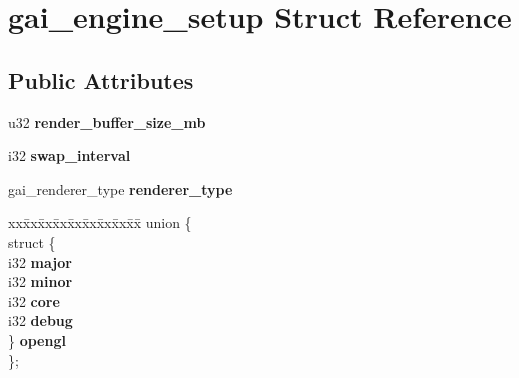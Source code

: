 \hypertarget{structgai__engine__setup}{}\section{gai\+\_\+engine\+\_\+setup Struct Reference}
\label{structgai__engine__setup}
\subsection*{Public Attributes}
\begin{DoxyCompactItemize}
\item 
\mbox{\label{structgai__engine__setup_a6f946b7d3c11abef7d0f34b339685ca0}} 
u32 {\bfseries render\+\_\+buffer\+\_\+size\+\_\+mb}
\item 
\mbox{\label{structgai__engine__setup_a6511a76398600b953d5fe6de5041ed7b}} 
i32 {\bfseries swap\+\_\+interval}
\item 
\mbox{\label{structgai__engine__setup_a1051e0a0e262464dec76fe44732bbef3}} 
gai\+\_\+renderer\+\_\+type {\bfseries renderer\+\_\+type}
\item 
\mbox{\label{structgai__engine__setup_ac3788affec1830e3b9b0c323c1373ae4}} 
\begin{tabbing}
xx\=xx\=xx\=xx\=xx\=xx\=xx\=xx\=xx\=\kill
union \{\\
\mbox{\label{structgai__engine__setup_ab9fa247fb71f3648eb64cf12746a041d}} 
\>struct \{\\
\mbox{\label{structgai__engine__setup_1_1_0D20_1_1_0D22_adee746fb694c45f01126ea2706b9bbc5}} 
i32 {\bfseries major}\\
\mbox{\label{structgai__engine__setup_1_1_0D20_1_1_0D22_aaab4b80635264db989253dee98ea5b2e}} 
i32 {\bfseries minor}\\
\mbox{\label{structgai__engine__setup_1_1_0D20_1_1_0D22_aa3acd90eebdceffcf9a2dac135a87ac5}} 
i32 {\bfseries core}\\
\mbox{\label{structgai__engine__setup_1_1_0D20_1_1_0D22_abc2cf2c6535db8b38e544a2e00779aa5}} 
i32 {\bfseries debug}\\
\>\} {\bfseries opengl}\\
\}; \\

\end{tabbing}\end{DoxyCompactItemize}


